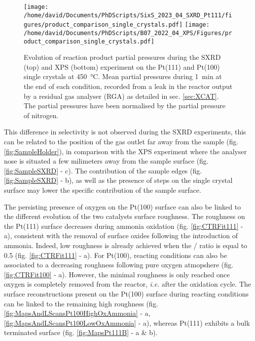 \begin{figure}[!htb]
    \centering
    \texttt{[image: /home/david/Documents/PhDScripts/SixS\_2023\_04\_SXRD\_Pt111/figures/product\_comparison\_single\_crystals.pdf]}
    \texttt{[image: /home/david/Documents/PhDScripts/B07\_2022\_04\_XPS/Figures/product\_comparison\_single\_crystals.pdf]}
    \caption{
        Evolution of reaction product partial pressures during the SXRD (top) and XPS (bottom) experiment on the Pt(111) and Pt(100) single crystals at \qty{450}{\degreeCelsius}.
        Mean partial pressures during \qty{1}{\minute} at the end of each condition, recorded from a leak in the reactor output by a residual gas analyser (RGA) as detailed in sec. \ref{sec:XCAT}.
        The partial pressures have been normalised by the partial pressure of nitrogen.
    }
    \label{fig:RGA450Pt111AndPt100}
\end{figure}

This difference in selectivity is not observed during the SXRD experiments, this can be related to the position of the gas outlet far away from the sample (fig. \ref{fig:SampleHolder}), in comparison with the XPS experiment where the analyser nose is situated a few milimeters away from the sample surface (fig. \ref{fig:SampleSXRD} - c).
The contribution of the sample edges (fig. \ref{fig:SampleSXRD} - b), as well as the presence of steps on the single crystal surface may lower the specific contribution of the sample surface.

The persisting presence of oxygen on the Pt(100) surface can also be linked to the different evolution of the two catalysts surface roughness.
The roughness on the Pt(111) surface decreases during ammonia oxidation (fig. \ref{fig:CTRFit111} - a), consistent with the removal of surface oxides following the introduction of ammonia.
Indeed, low roughness is already achieved when the / ratio is equal to \num{0.5} (fig. \ref{fig:CTRFit111} - a).
For Pt(100), reacting conditions can also be associated to a decreasing roughness following pure oxygen atmopshere (fig. \ref{fig:CTRFit100} - a).
However, the minimal roughness is only reached once oxygen is completely removed from the reactor, \textit{i.e.} after the oxidation cycle.
The surface reconstructions present on the Pt(100) surface during reacting conditions can be linked to the remaining high roughness (fig. \ref{fig:MapsAndLScansPt100HighOxAmmonia} - a, \ref{fig:MapsAndLScansPt100LowOxAmmonia} - a), whereas Pt(111) exhibits a bulk terminated surface (fig. \ref{fig:MapsPt111B} - a \& b).


